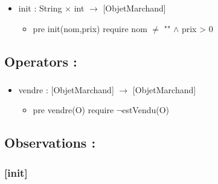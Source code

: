 \documentclass[11pt]{article}
\begin{document}
\subsubsection{}

\begin{itemize}

\item init : String $\times$ int $\to$ [ObjetMarchand]\\
\label{sec-1.5.1.1}

\begin{itemize}

\item pre init(nom,prix) require nom $\neq$ "" $\wedge$ prix > 0\\
\label{sec-1.5.1.1.1}



\end{itemize} %
\end{itemize} %
\subsection{Operators :}
\label{sec-1.6}

\subsubsection{}

\begin{itemize}

\item vendre : [ObjetMarchand] $\to$ [ObjetMarchand]\\
\label{sec-1.6.1.1}

\begin{itemize}

\item pre vendre(O) require $\neg$estVendu(O)\\
\label{sec-1.6.1.1.1}



\end{itemize} %
\end{itemize} %
\subsection{Observations :}
\label{sec-1.7}

\subsubsection{[init]}
\label{sec-1.7.1}
\end{document}
